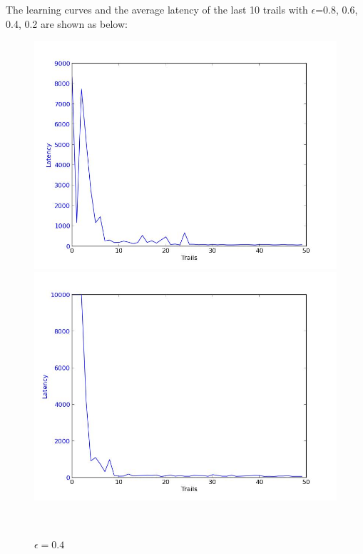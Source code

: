 \documentclass[a4paper, 11pt]{article}
\begin{document}
The learning curves and the average latency of the last 10 trails with $\epsilon$=0.8, 0.6, 0.4, 0.2 are shown as below:

\begin{figure}
  \centering
  \begin{minipage}[c]{0.5\textwidth}
    \centering
    \includegraphics[scale=0.3]{../figure/eps2.jpeg}
      \caption{$\epsilon = 0.2$}
  \end{minipage}%
  \begin{minipage}[c]{0.5\textwidth}
    \centering
    \includegraphics[scale=0.3]{../figure/eps4.jpeg}
      \caption{$\epsilon = 0.4$}
    \end{minipage}
    \\

\end{figure}
\end{document}
